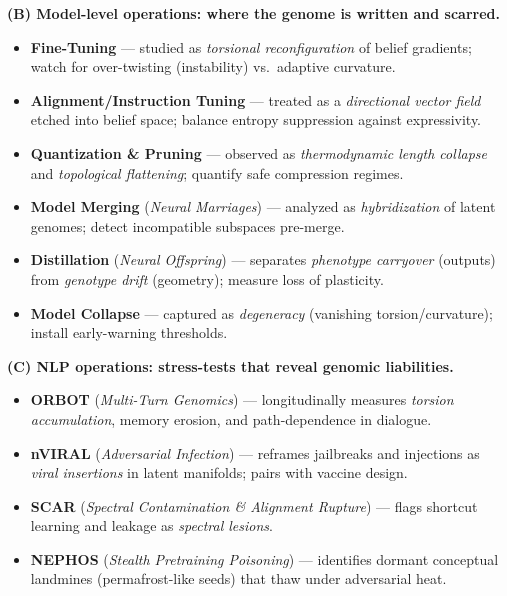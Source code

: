 \documentclass[11pt]{article}
\begin{document}
\medskip
\noindent\textbf{(B) Model-level operations: where the genome is written and scarred.}
\begin{itemize}
  \item \textbf{Fine-Tuning} --- studied as \emph{torsional reconfiguration} of belief gradients; watch for over-twisting (instability) vs.\ adaptive curvature.
  \item \textbf{Alignment/Instruction Tuning} --- treated as a \emph{directional vector field} etched into belief space; balance entropy suppression against expressivity.
  \item \textbf{Quantization \& Pruning} --- observed as \emph{thermodynamic length collapse} and \emph{topological flattening}; quantify safe compression regimes.
  \item \textbf{Model Merging} (\emph{Neural Marriages}) --- analyzed as \emph{hybridization} of latent genomes; detect incompatible subspaces pre-merge.
  \item \textbf{Distillation} (\emph{Neural Offspring}) --- separates \emph{phenotype carryover} (outputs) from \emph{genotype drift} (geometry); measure loss of plasticity.
  \item \textbf{Model Collapse} --- captured as \emph{degeneracy} (vanishing torsion/curvature); install early-warning thresholds.
\end{itemize}

\medskip
\noindent\textbf{(C) NLP operations: stress-tests that reveal genomic liabilities.}
\begin{itemize}
  \item \textbf{ORBOT} (\emph{Multi-Turn Genomics}) --- longitudinally measures \emph{torsion accumulation}, memory erosion, and path-dependence in dialogue.
  \item \textbf{nVIRAL} (\emph{Adversarial Infection}) --- reframes jailbreaks and injections as \emph{viral insertions} in latent manifolds; pairs with vaccine design.
  \item \textbf{SCAR} (\emph{Spectral Contamination \& Alignment Rupture}) --- flags shortcut learning and leakage as \emph{spectral lesions}.
  \item \textbf{NEPHOS} (\emph{Stealth Pretraining Poisoning}) --- identifies dormant conceptual landmines (permafrost-like seeds) that thaw under adversarial heat.
\end{itemize}
\end{document}
